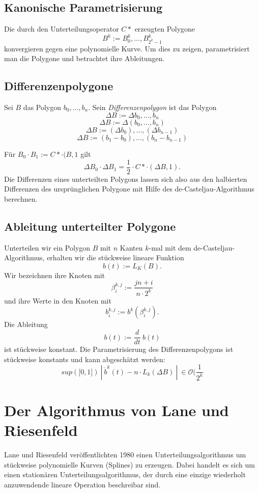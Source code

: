 \subsection{Kanonische Parametrisierung}
Die durch den Unterteilungsoperator \(C*\) erzeugten Polygone
\[B^k := B_0^k,...,B_{2^k-1}^k\]
konvergieren gegen eine polynomielle Kurve. Um dies zu zeigen, parametrisiert man die Polygone und betrachtet ihre Ableitungen.


\subsection{Differenzenpolygone}
Sei \(B\) das Polygon \(b_0,...,b_n\). Sein \textit{Differenzenpolygon} ist das Polygon
\[\Delta B := \Delta b_0,...,b_n\]
\[\Delta B := \Delta(b_0,...,b_n)\]
\[\Delta B := (\Delta b_0),...,(\Delta b_{n-1})\]
\[\Delta B := (b_1-b_0),...,(b_n-b_{n-1})\]

Für \(B_0\cdot B_1 := C*\cdot(B,1\) gilt
\[\Delta B_0\cdot \Delta B_1 = \frac{1}{2}\cdot C* \cdot(\Delta B,1).\]
Die Differenzen eines unterteilten Polygons lassen sich also aus den halbierten Differenzen des ursprünglichen Polygone mit Hilfe des de-Casteljau-Algorithmus berechnen.


\subsection{Ableitung unterteilter Polygone}
Unterteilen wir ein Polygon \(B\) mit \(n\) Kanten \(k\)-mal mit dem de-Casteljau-Algorithmus, erhalten wir die stückweise lineare Funktion
\[b(t) := L_K(B).\]
Wir bezeichnen ihre Knoten mit
\[\beta_i^{k,j} := \frac{jn+i}{n\cdot 2^k}\]
und ihre Werte in den Knoten mit
\[b_i^{k,j} := b^k(\beta_i^{k,j}).\]
Die Ableitung
\[b(t) := \frac{d}{dt}~b(t)\]
ist stückweise konstant. Die Parametrisierung des Differenzenpolygons ist stückweise konstants und kann abgeschätzt werden:
\[sup(\lbrack0,1\rbrack)~|~\dot{b}^k(t)-n\cdot L_k(\Delta B)~|~\in \mathcal{O}(\frac{1}{2^k}\]




\section{Der Algorithmus von Lane und Riesenfeld}
Lane und Riesenfeld veröffentlichten 1980 einen Unterteilungsalgorithmus um stückweise polynomielle Kurven (Splines) zu erzeugen. Dabei handelt es sich um einen stationären Unterteilungsalgorithmus, der durch eine einzige wiederholt anzuwendende lineare Operation beschreibar sind.

